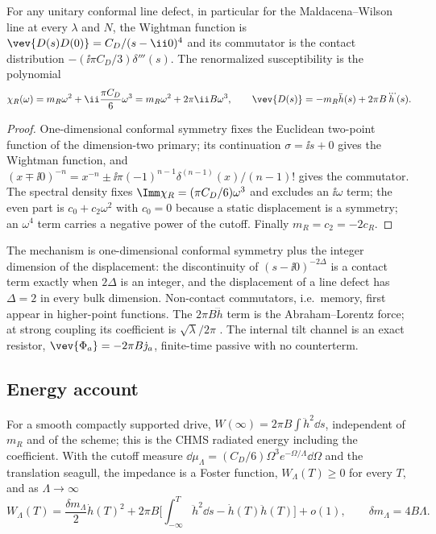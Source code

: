 \begin{proposition}[locality]
\label{prop:locality}
For any unitary conformal line defect, in particular for the Maldacena--Wilson line at every $\lambda$ and
$N$, the Wightman function is $\vev{D(s)D(0)}=C_D/(s-\ii0)^4$ and its commutator is the contact
distribution $-(\ii\pi C_D/3)\delta'''(s)$. The renormalized susceptibility is the polynomial
\begin{equation}
\chi_R(\omega)=m_R\omega^2+\ii\frac{\pi C_D}{6}\omega^3=m_R\omega^2+2\pi\ii B\omega^3,\qquad
\vev{D(s)}=-m_R\ddot h(s)+2\pi B\dddot h(s).
\label{eq:AL}
\end{equation}
\end{proposition}

\begin{proof}
One-dimensional conformal symmetry fixes the Euclidean two-point function of the dimension-two primary;
its continuation $\sigma=\ii s+0$ gives the Wightman function, and
$(x\mp\ii0)^{-n}=x^{-n}\pm\ii\pi(-1)^{n-1}\delta^{(n-1)}(x)/(n-1)!$ gives the commutator. The spectral density
fixes $\Imm\chi_R=(\pi C_D/6)\omega^3$ and excludes an $\ii\omega$ term; the even part is $c_0+c_2\omega^2$ with
$c_0=0$ because a static displacement is a symmetry; an $\omega^4$ term carries a negative power of the
cutoff. Finally $m_R=c_2=-2c_R$.
\end{proof}

The mechanism is one-dimensional conformal symmetry plus the integer dimension of the displacement: the
discontinuity of $(s-\ii0)^{-2\Delta}$ is a contact term exactly when $2\Delta$ is an integer, and the
displacement of a line defect has $\Delta=2$ in every bulk dimension. Non-contact commutators, i.e.\ memory,
first appear in higher-point functions. The $2\pi B\dddot h$ term is the \Nfour{} Abraham--Lorentz force;
at strong coupling its coefficient is $\sqrt\lambda/2\pi$ \cite{Mikhailov}. The internal tilt channel is an
exact resistor, $\vev{\Phi_a}=-2\pi B\dot\jmath_a$, finite-time passive with no counterterm.

\subsection{Energy account}

\begin{proposition}[work]
\label{prop:work}
For a smooth compactly supported drive, $W(\infty)=2\pi B\int\ddot h^2\dd s$, independent of $m_R$ and of the
scheme; this is the CHMS radiated energy including the coefficient. With the cutoff measure
$\dd\mu_\Lambda=(C_D/6)\Omega^3e^{-\Omega/\Lambda}\dd\Omega$ and the translation seagull, the impedance is a
Foster function, $W_\Lambda(T)\ge0$ for every $T$, and as $\Lambda\to\infty$
\begin{equation}
W_\Lambda(T)=\frac{\delta m_\Lambda}{2}\dot h(T)^2+2\pi B\Big[\int_{-\infty}^T\ddot h^2\dd s-\dot h(T)\ddot h(T)\Big]+o(1),
\qquad \delta m_\Lambda=4B\Lambda .
\end{equation}
\end{proposition}

